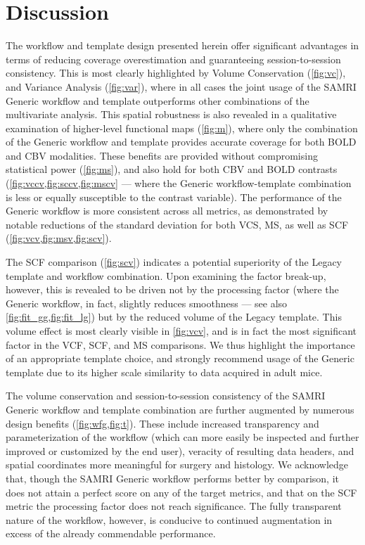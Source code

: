 \section{Discussion}

The workflow and template design presented herein offer significant advantages in terms of reducing coverage overestimation and guaranteeing session-to-session consistency.
This is most clearly highlighted by Volume Conservation (\cref{fig:vc}), and Variance Analysis (\cref{fig:var}), where in all cases the joint usage of the SAMRI Generic workflow and template outperforms other combinations of the multivariate analysis.
This spatial robustness is also revealed in a qualitative examination of higher-level functional maps (\cref{fig:m}), where only the combination of the Generic workflow and template provides accurate coverage for both BOLD and CBV modalities.
These benefits are provided without compromising statistical power (\cref{fig:ms}), and also hold for both CBV and BOLD contrasts (\cref{fig:vccv,fig:sccv,fig:mscv} --- where the Generic workflow-template combination is less or equally susceptible to the contrast variable).
The performance of the Generic workflow is more consistent across all metrics, as demonstrated by notable reductions of the standard deviation for both VCS, MS, as well as SCF (\cref{fig:vcv,fig:msv,fig:scv}).

The SCF comparison (\cref{fig:scv}) indicates a potential superiority of the Legacy template and workflow combination.
Upon examining the factor break-up, however, this is revealed to be driven not by the processing factor (where the Generic workflow, in fact, slightly reduces smoothness --- see also \cref{fig:fit_gg,fig:fit_lg}) but by the reduced volume of the Legacy template.
This volume effect is most clearly visible in \cref{fig:vcv}, and is in fact the most significant factor in the VCF, SCF, and MS comparisons.
We thus highlight the importance of an appropriate template choice, and strongly recommend usage of the Generic template due to its higher scale similarity to data acquired in adult mice.

The volume conservation and session-to-session consistency of the SAMRI Generic workflow and template combination are further augmented by numerous design benefits (\cref{fig:wfg,fig:t}).
These include increased transparency and parameterization of the workflow (which can more easily be inspected and further improved or customized by the end user), veracity of resulting data headers, and spatial coordinates more meaningful for surgery and histology.
We acknowledge that, though the SAMRI Generic workflow performs better by comparison, it does not attain a perfect score on any of the target metrics, and that on the SCF metric the processing factor does not reach significance.
The fully transparent nature of the workflow, however, is conducive to continued augmentation in excess of the already commendable performance.

